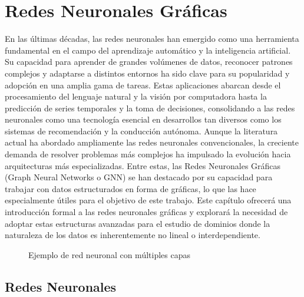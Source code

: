 \chapter{Redes Neuronales Gráficas}
En las últimas décadas, las redes neuronales han emergido como una herramienta fundamental en el campo del aprendizaje automático y la inteligencia artificial. Su capacidad para aprender de grandes volúmenes de datos, reconocer patrones complejos y adaptarse a distintos entornos ha sido clave para su popularidad y adopción en una amplia gama de tareas. Estas aplicaciones abarcan desde el procesamiento del lenguaje natural y la visión por computadora hasta la predicción de series temporales y la toma de decisiones, consolidando a las redes neuronales como una tecnología esencial en desarrollos tan diversos como los sistemas de recomendación y la conducción autónoma.
Aunque la literatura actual ha abordado ampliamente las redes neuronales convencionales, la creciente demanda de resolver problemas más complejos ha impulsado la evolución hacia arquitecturas más especializadas. Entre estas, las Redes Neuronales Gráficas (Graph Neural Networks o GNN) se han destacado por su capacidad para trabajar con datos estructurados en forma de gráficas, lo que las hace especialmente útiles para el objetivo de este trabajo.
Este capítulo ofrecerá una introducción formal a las redes neuronales gráficas y explorará la necesidad de adoptar estas estructuras avanzadas para el estudio de dominios donde la naturaleza de los datos es inherentemente no lineal o interdependiente.

\begin{figure}[H]
    \centering
    \caption{Ejemplo de red neuronal con múltiples capas}
    \label{fig:red_neuronal_multicapa}

\end{figure}

\section{Redes Neuronales}

